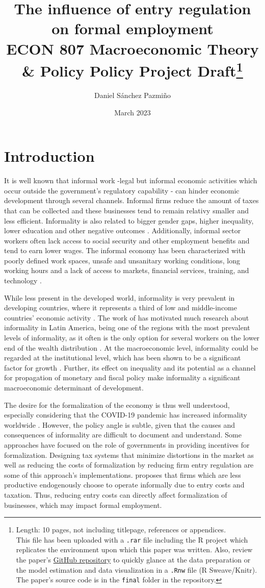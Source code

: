 \documentclass[11pt,a4paper]{article}\usepackage[]{graphicx}\usepackage[]{xcolor}
\title{The influence of entry regulation on formal employment \\[1em] 
\large{ECON 807 Macroeconomic Theory \& Policy Policy Project Draft}\footnote{
Length: 10 pages, not including titlepage, references or appendices. \\
This file has been uploaded with a \texttt{.rar} file including the R project which replicates the environment upon which this paper was written. Also, review the paper's \href{https://github.com/dsanchezp18/econ807-policy-project}{GitHub repository} to quickly glance at the data preparation or the model estimation and data visualization in a \texttt{.Rnw} file (R Sweave/Knitr). The paper's source code is in the \texttt{final} folder in the repository.}}
\author{Daniel Sánchez Pazmiño}
\date{March 2023}
\begin{document}
\maketitle
\section{Introduction}

It is well known that informal work -legal but informal economic activities which occur outside the government's regulatory capability \parencite{Sassen.1994}- can hinder economic development through several channels. Informal firms reduce the amount of taxes that can be collected and these businesses tend to remain relativy smaller and less efficient. Informality is also related to bigger gender gaps, higher inequality, lower education and other negative outcomes \parencite{Delechat2020}. Additionally, informal sector workers often lack access to social security and other employment benefits and tend to earn lower wages. The informal economy has been characterized with poorly defined work spaces, unsafe and unsanitary working conditions, long working hours and a lack of access to markets, financial services, training, and technology \parencite{IloND}. 

While less present in the developed world, informality is very prevalent in developing countries, where it represents a third of low and middle-income countries' economic activity \parencite{Delechat2020}. The work of \textcite{Soto.2002} has motivated much research about informality in Latin America, being one of the regions with the most prevalent levels of informality, as it often is the only option for several workers on the lower end of the wealth distribution \parencite{Oviedo.2009}. At the macroeconomic level, informality could be regarded at the institutional level, which has been shown to be a significant factor for growth \parencite{Acemoglu.2001, RafaelLaPorta.1997, Glaeser.2004}. Further, its effect on inequality and its potential as a channel for propagation of monetary and fiscal policy \parencite{Alberola.2020} make informality a significant macroeconomic determinant of development.

The desire for the formalization of the economy is thus well understood, especially considering that the COVID-19 pandemic has increased informality worldwide \parencite{ILO.2022}. However, the policy angle is subtle, given that the causes and consequences of informality are difficult to document and understand. Some approaches have focused on the role of governments in providing incentives for formalization. Designing tax systems that minimize distortions in the market \parencite{Bardey.2019} as well as reducing the costs of formalization by reducing firm entry regulation are some of this approach's implementations. \textcite{MauricioPrado.2011} proposes that firms which are less productive endogenously choose to operate informally due to entry costs and taxation. Thus, reducing entry costs can directly affect formalization of businesses, which may impact formal employment.
\end{document}
